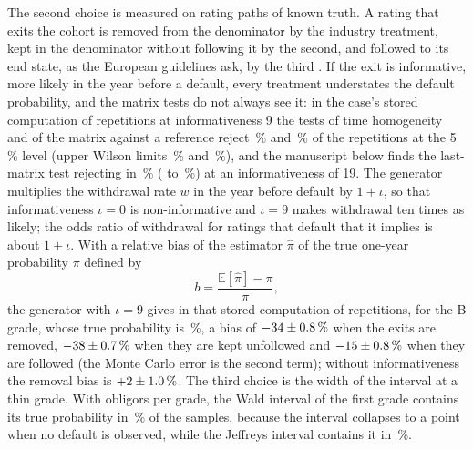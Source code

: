 The second choice is measured on rating paths of known truth. A rating that exits the cohort is removed from the denominator by the industry treatment,
kept in the denominator without following it by the second, and followed to its end state, as the European guidelines ask, by the third
\citep{validation-tests:eba2018gl1716}. If the exit is informative, more likely in the year before a default, every treatment understates the default probability, and the matrix tests do not always see it: in the case's stored computation of \pxFourReps{} repetitions at informativeness 9 the tests of time
homogeneity and of the matrix against a reference reject \pxFourThNine{}\,\% and \pxFourMrNine{}\,\% of the repetitions at the 5\,\% level (upper Wilson limits
\pxFourThNineHi{}\,\% and \pxFourMrNineHi{}\,\%), and the manuscript below finds the last-matrix test rejecting in \pxPpFourMrNineteen{}\,\% (\pxPpFourMrNineteenLo{} to \pxPpFourMrNineteenHi{}\,\%)
at an informativeness of 19. The generator multiplies the withdrawal rate $w$ in the year before default by $1+\iota$, so that informativeness $\iota=0$ is
non-informative and $\iota=9$ makes withdrawal ten times as likely; the odds ratio of withdrawal for ratings that default that it implies is about $1+\iota$.
With a relative bias of the estimator $\hat\pi$ of the true one-year probability $\pi$ defined by
\begin{equation}
b=\frac{\mathbb E[\hat\pi]-\pi}{\pi},
\label{eq:bs4-bias}
\end{equation}
the generator with $\iota=9$ gives in that stored computation of \pxFourReps{} repetitions, for the B grade, whose true
probability is \pxFourTruthB{}\,\%, a bias of $-34\pm0.8\,\%$ when the exits are removed, $-38\pm0.7\,\%$ when they are kept unfollowed and
$-15\pm0.8\,\%$ when they are followed (the Monte Carlo error is the second term); without informativeness the removal bias is $+2\pm1.0\,\%$. The third choice is the width of the interval
at a thin grade. With \pxFourThinN{} obligors per grade, the Wald interval of the first grade contains its true probability in \pxFourWaldAaa{}\,\% of the samples,
because the interval collapses to a point when no default is observed, while the Jeffreys interval \citep{proposed:jeffreys1946,ratings:brown2001} contains it in
\pxFourJeffAaa{}\,\%.

